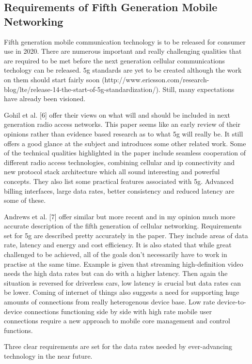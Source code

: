 \documentclass[conference]{IEEEtran}
\begin{document}
\subsection{Requirements of Fifth Generation Mobile Networking}
Fifth generation mobile communication technology is to be released for consumer use in 2020. There are numerous important and really challenging qualities that are required to be met before the next generation cellular communications techology can be released. 5g standards are yet to be created although the work on them should start fairly soon (http://www.ericsson.com/research-blog/lte/release-14-the-start-of-5g-standardization/). Still, many expectations have already been visioned.
\par
Gohil et al. [6] offer their views on what will and should be included in next generation radio access networks. This paper seems like an early review of their opinions rather than evidence based research as to what 5g will really be. It still offers a good glance at the subject and introduces some other related work. Some of the technical qualities highlighted in the paper include seamless cooperation of different radio access technologies, combining cellular and ip connectivity and new protocol stack architecture which all sound interesting and powerful concepts. They also list some practical features associated with 5g. Advanced billing interfaces, large data rates, better consistency and reduced latency are some of these.
\par
Andrews et al. [7] offer similar but more recent and in my opinion much more accurate description of the fifth generation of cellular networking. Requirements set for 5g are described pretty accurately in the paper. They include areas of data rate, latency and energy and cost efficiency. It is also stated that while great challenged to be achieved, all of the goals don't necessarily have to work in practise at the same time. Example is given that streaming high-definition video needs the high data rates but can do with a higher latency. Then again the situation is reversed for driverless cars, low latency is crucial but data rates can be lower. Coming of internet of things also suggests a need for supporting huge amounts of connections from really heterogenous device base. Low rate device-to-device connections functioning side by side with high rate mobile user connections require a new approach to mobile core management and control functions.
\par
Three clear requirements are set for the data rates needed by ever-advancing technology in the near future.
\end{document}
